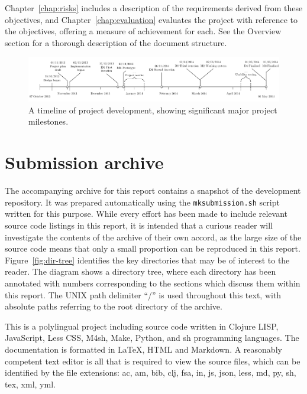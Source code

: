 \begin{multicols}{2}
\noindent
Chapter~\ref{chap:risks} includes a description of the requirements
derived from these objectives, and Chapter~\ref{chap:evaluation}
evaluates the project with reference to the objectives, offering a
measure of achievement for each. See the Overview section for a
thorough description of the document structure.

\columnbreak

\begin{figure}[H]
\centering
\includegraphics[angle=90,origin=c,height=0.4561\paperheight]{assets/timeline}
\caption[Project development timeline]
        {A timeline of project development, showing significant major
          project milestones.}
\label{fig:timeline}
\end{figure}

\end{multicols}

\newpage

\newpage
\section*{Submission archive}
The accompanying archive for this report contains a snapshot of the
development repository. It was prepared automatically using the
\texttt{mksubmission.sh} script written for this purpose. While every
effort has been made to include relevant source code listings in this
report, it is intended that a curious reader will investigate the
contents of the archive of their own accord, as the large size of the
source code means that only a small proportion can be reproduced in
this report. Figure~\ref{fig:dir-tree} identifies the key directories
that may be of interest to the reader. The diagram shows a directory
tree, where each directory has been annotated with numbers
corresponding to the sections which discuss them within this
report. The UNIX path delimiter ``/'' is used throughout this text,
with absolute paths referring to the root directory of the archive.

This is a polylingual project including source code written in Clojure
LISP, JavaScript, Less CSS, M4sh, Make, Python, and sh programming
languages. The documentation is formatted in \LaTeX, HTML and
Markdown. A reasonably competent text editor is all that is required
to view the source files, which can be identified by the file
extensions: ac, am, bib, clj, fsa, in, js, json, less, md, py, sh,
tex, xml, yml.

